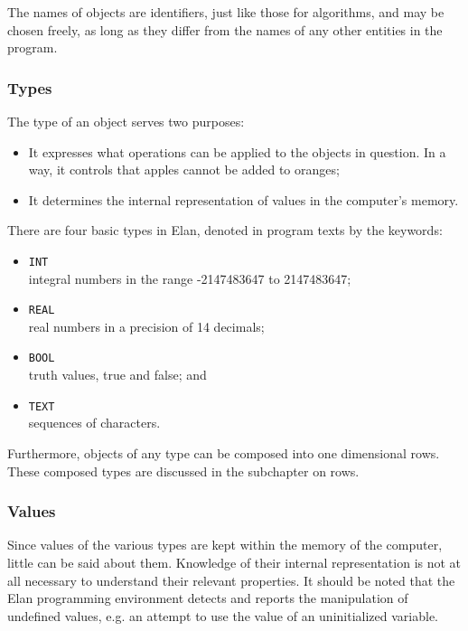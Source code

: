 The names of objects are identifiers, just like those for algorithms,
and may be chosen freely, as long as they differ from the names
of any other entities in the program.

\subsubsection{Types}

The type of an object serves two purposes:

\begin{itemize}
\item It expresses what operations can be applied to the objects
in question. In a way, it controls that apples cannot be added
to oranges;
\item It determines the internal representation of values in
the computer's memory.
\end{itemize}

\noindent
There are four basic types in Elan, denoted in program texts
by the keywords:

\begin{itemize}
\item {\tt INT   }\\
      integral numbers in the range -2147483647 to 2147483647;
\item {\tt REAL  }\\
      real numbers in a precision of  14 decimals;
\item {\tt BOOL  }\\
      truth values, true and false; and
\item {\tt TEXT  }\\
      sequences of characters.
\end{itemize}

\noindent
Furthermore, objects of any type can be composed into one dimensional
rows. These composed types are discussed in the subchapter on
rows.

\subsubsection{Values}

Since values of the various types are kept within the memory
of the computer, little can be said about them. Knowledge of
their internal representation is not at all necessary to understand
their relevant properties. It should be noted that the Elan programming
environment detects and reports the manipulation of undefined
values, e.g. an attempt to use the value of an uninitialized
variable.

